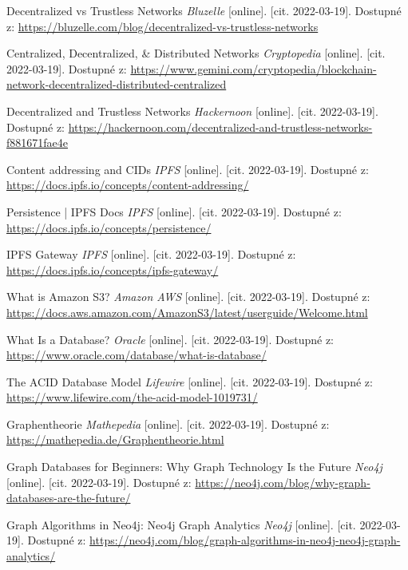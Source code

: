 \begin{thebibliography}{100}
 Decentralized vs Trustless Networks \textit{Bluzelle} [online]. [cit. 2022-03-19]. Dostupné z: \url{https://bluzelle.com/blog/decentralized-vs-trustless-networks}

 Centralized, Decentralized, \& Distributed Networks \textit{Cryptopedia} [online]. [cit. 2022-03-19]. Dostupné z: \url{https://www.gemini.com/cryptopedia/blockchain-network-decentralized-distributed-centralized}

 Decentralized and Trustless Networks \textit{Hackernoon} [online]. [cit. 2022-03-19]. Dostupné z: \url{https://hackernoon.com/decentralized-and-trustless-networks-f881671fae4e}

 Content addressing and CIDs \textit{IPFS} [online]. [cit. 2022-03-19]. Dostupné z: \url{https://docs.ipfs.io/concepts/content-addressing/}

 Persistence | IPFS Docs \textit{IPFS} [online]. [cit. 2022-03-19]. Dostupné z: \url{https://docs.ipfs.io/concepts/persistence/}

 IPFS Gateway \textit{IPFS} [online]. [cit. 2022-03-19]. Dostupné z: \url{https://docs.ipfs.io/concepts/ipfs-gateway/}

 What is Amazon S3? \textit{Amazon AWS} [online]. [cit. 2022-03-19]. Dostupné z: \url{https://docs.aws.amazon.com/AmazonS3/latest/userguide/Welcome.html}

 What Is a Database? \textit{Oracle} [online]. [cit. 2022-03-19]. Dostupné z: \url{https://www.oracle.com/database/what-is-database/}

 The ACID Database Model \textit{Lifewire} [online]. [cit. 2022-03-19]. Dostupné z: \url{https://www.lifewire.com/the-acid-model-1019731/}

 Graphentheorie \textit{Mathepedia} [online]. [cit. 2022-03-19]. Dostupné z: \url{https://mathepedia.de/Graphentheorie.html}

 Graph Databases for Beginners: Why Graph Technology Is the Future \textit{Neo4j} [online]. [cit. 2022-03-19]. Dostupné z: \url{https://neo4j.com/blog/why-graph-databases-are-the-future/}

 Graph Algorithms in Neo4j: Neo4j Graph Analytics \textit{Neo4j} [online]. [cit. 2022-03-19]. Dostupné z: \url{https://neo4j.com/blog/graph-algorithms-in-neo4j-neo4j-graph-analytics/}


\end{thebibliography}
